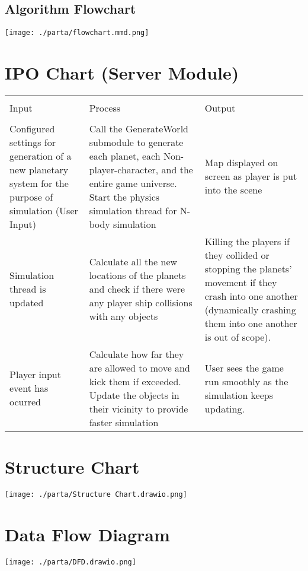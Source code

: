 \documentclass[12pt, DIV=calc]{scrartcl}
\newenvironment{alscape}[1]%
{%
    \begin{landscape}
}%
{%
    \end{landscape}
}
\begin{document}
\subsection{Algorithm Flowchart}
\texttt{[image: ./parta/flowchart.mmd.png]}
\clearpage

\section{IPO Chart (Server Module)}
\begin{xltabular}[c]{\textwidth}{| X | X | X |}
    \hline \\
Input & Process & Output \\ \hline \\
Configured settings for generation of a new planetary system for the purpose of simulation (User Input) & Call the GenerateWorld submodule to generate each planet, each Non-player-character, and the entire game universe. Start the physics simulation thread for N-body simulation & Map displayed on screen as player is put into the scene \\ \hline
Simulation thread is updated & Calculate all the new locations of the planets and check if there were any player ship collisions with any objects & Killing the players if they collided or stopping the planets' movement if they crash into one another (dynamically crashing them into one another is out of scope). \\ \hline
Player input event has ocurred & Calculate how far they are allowed to move and kick them if exceeded. Update the objects in their vicinity to provide faster simulation & User sees the game run smoothly as the simulation keeps updating. \\ 
    \hline
\end{xltabular}


\clearpage
\begin{alscape}{DIV=8}
\section{Structure Chart}
\texttt{[image: ./parta/Structure Chart.drawio.png]}

\clearpage
\section{Data Flow Diagram}
\texttt{[image: ./parta/DFD.drawio.png]}
\end{alscape}
\end{document}
